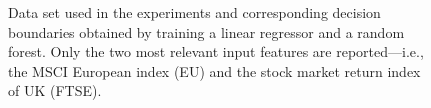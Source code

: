 \documentclass[sigconf]{acmart}
\begin{document}
\begin{figure}[h]
{	}
	\caption{Data set used in the experiments and corresponding decision boundaries obtained by training a linear regressor and a random forest. Only the two most relevant input features are reported---i.e., the MSCI European index (EU) and the stock market return index of UK (FTSE).}\label{fig:dataPred}
\end{figure}

\begin{figure}[p]\centering
\end{figure}
\end{document}
